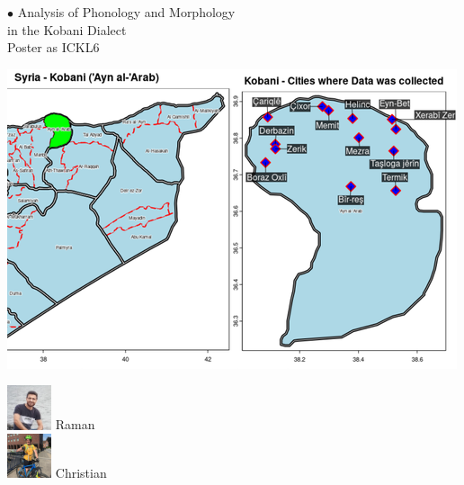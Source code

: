 \documentclass[aspectratio=169]{beamer}
\begin{document}
\begin{frame}[fragile]
\begin{minipage}{.49\textwidth}
    \end{minipage}\hfill%
    \begin{minipage}{.49\textwidth}
        {\color{thiscolor}$\bullet$} Analysis of Phonology and Morphology \\ in the Kobani Dialect 
        \\ \citep{ahmad2023AnalysisPhonologyMorphology} Poster as ICKL6
        \vspace{5mm}
        \begin{minipage}{.70\textwidth}
            \centering
            \includegraphics[width=\textwidth]{images/ickl6_kobanianalysis.png}
        \end{minipage}%
        \begin{minipage}{.30\textwidth}
            \centering
            \includegraphics[height=1.3cm]{images/Raman_Ahmad.png}
            Raman
            \vspace{0.5cm}
            \\ \includegraphics[height=1.3cm]{images/Christian_Schuler_Bike.JPG} 
            Christian
        \end{minipage}
    \end{minipage}
\end{frame}
\end{document}
